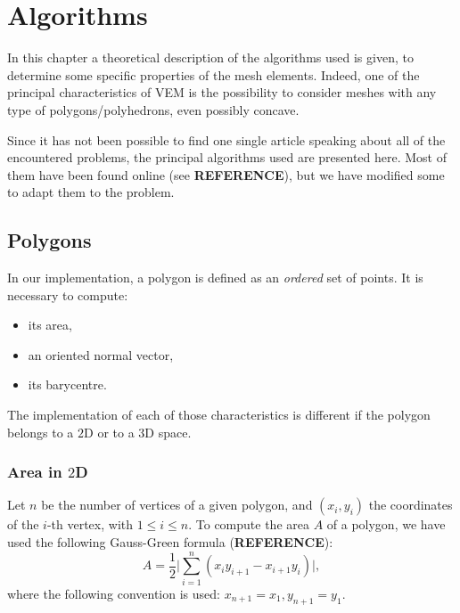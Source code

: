 \newpage
\section{Algorithms}
In this chapter a theoretical description of the algorithms used is given, to determine some specific properties of the mesh elements. Indeed, one of the principal characteristics of VEM is the possibility to consider meshes with any type of polygons/polyhedrons, even possibly concave. 

Since it has not been possible to find one single article speaking about all of the encountered problems, the principal algorithms used are presented here. Most of them have been found online (see \textbf{REFERENCE}), but we have modified some to adapt them to the problem.

\subsection{Polygons}\label{polygons}
In our implementation, a polygon is defined as an \textit{ordered} set of points. It is necessary to compute:
\begin{itemize}
\item its area,
\item an oriented normal vector,
\item its barycentre.
\end{itemize}
The implementation of each of those characteristics is different if the polygon belongs to a $2$D or to a $3$D space.

\subsubsection{Area in $2$D}\label{area2d}
Let $n$ be the number of vertices of a given polygon, and $(x_i,y_i)$ the coordinates of the $i$-th vertex, with $1\leq i\leq n$. To compute the area $A$ of a polygon, we have used the following Gauss-Green formula (\textbf{REFERENCE}):
$$ A=\frac{1}{2} \bigg | \sum_{i=1}^n (x_iy_{i+1}-x_{i+1}y_i) \bigg
|,$$
where the following convention is used: $x_{n+1}=x_1,y_{n+1}=y_1$.

